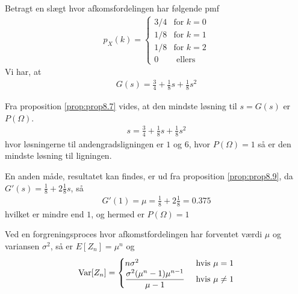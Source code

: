 \begin{exmp} %
    Betragt en slægt hvor afkomsfordelingen har følgende pmf
    \begin{align*}
        p_X(k) = \begin{cases}
                    3/4  & \text{for } k = 0 \\
                    1/8  & \text{for } k = 1 \\
                    1/8  & \text{for } k = 2 \\
                    0 & \text{ ellers}
                \end{cases}
    \end{align*}
Vi har, at 
\begin{align*}
    G(s)=\frac{3}{4}+\frac{1}{8}s+\frac{1}{8}s^2
\end{align*}

Fra proposition \ref{prop:prop8.7} vides, at den mindste løsning til $s=G(s)$ er $P(\Omega)$.
\begin{align*}
    s=\frac{3}{4}+\frac{1}{8}s+\frac{1}{8}s^2
\end{align*}
hvor løsningerne til andengradsligningen er $1$ og $6$, hvor $P(\Omega)=1$ så er den mindste løsning til ligningen. 

En anden måde, resultatet kan findes, er ud fra proposition \ref{prop:prop8.9}, da $G'(s)=\frac{1}{8}+2\frac{1}{8}s$, så 
\begin{align*}
    G'(1)=\mu=\frac{1}{8}+2\frac{1}{8}=0.375
\end{align*}
hvilket er mindre end $1$, og hermed er $P(\Omega)=1$
\end{exmp}


\begin{prop} %
Ved en forgreningsproces hvor afkomstfordelingen har forventet værdi $\mu$ og variansen $\sigma^2$, så er $E[Z_n]=\mu^n$ og
    \begin{equation*}
        \textnormal{Var}[Z_n] = \begin{cases} 
        n\sigma^2 & \text{ hvis } \mu =1\\
        \dfrac{\sigma^2(\mu^n-1)\mu^{n-1}}{\mu-1} & \text{ hvis } \mu \neq 1
        \end{cases}
    \end{equation*}
\end{prop}

